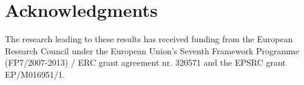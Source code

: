 \documentclass[format=acmsmall, screen=true]{acmart}
\begin{document}

%
%





\maketitle

\renewcommand{\shortauthors}{G. Allais, R. Atkey, J. Chapman, C. McBride, J. McKinna}



\section*{Acknowledgments}

The research leading to these results has received funding from the European
Research Council under the European Union’s Seventh Framework Programme (FP7/2007-2013)
/ ERC grant agreement nr. 320571 and the EPSRC grant EP/M016951/1.



\end{document}
